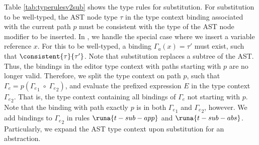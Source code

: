 Table \ref{tab:typerulesv2sub} shows the type rules for substitution. For substitution to be well-typed, the AST node type $\tau$ in the type context binding associated with the current path $p$ must be consistent with the type of the AST node modifier to be inserted. In , we handle the special case where we insert a variable reference $x$. For this to be well-typed, a binding $\Gamma_a(x)=\tau'$ must exist, such that $\consistent{\tau}{\tau'}$. Note that substitution replaces a subtree of the AST. Thus, the bindings in the editor type context with paths starting with $p$ are no longer valid. Therefore, we split the type context on path $p$, such that $\Gamma_e = p\left({\Gamma_e}_1\;\circ\;{\Gamma_e}_2\right)$, and evaluate the prefixed expression $E$ in the type context ${\Gamma_e}_2$. That is, the type context containing all bindings of $\Gamma_e$ not starting with $p$. Note that the binding with path exactly $p$ is in both ${\Gamma_e}_1$ and ${\Gamma_e}_2$, however. We add bindings to ${\Gamma_e}_2$ in rules $\runa{t-sub-app}$ and $\runa{t-sub-abs}$. Particularly, we expand the AST type context upon substitution for an abstraction.\\

